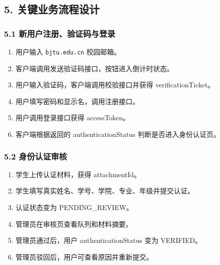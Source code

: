\documentclass[
]{ctexart}
\providecommand{\tightlist}{%
  \setlength{\itemsep}{0pt}\setlength{\parskip}{0pt}}
\begin{document}
\hypertarget{ux5173ux952eux4e1aux52a1ux6d41ux7a0bux8bbeux8ba1}{%
\subsection{5.
关键业务流程设计}\label{ux5173ux952eux4e1aux52a1ux6d41ux7a0bux8bbeux8ba1}}

\hypertarget{ux65b0ux7528ux6237ux6ce8ux518cux9a8cux8bc1ux7801ux4e0eux767bux5f55}{%
\subsubsection{5.1
新用户注册、验证码与登录}\label{ux65b0ux7528ux6237ux6ce8ux518cux9a8cux8bc1ux7801ux4e0eux767bux5f55}}

\begin{enumerate}
\def\labelenumi{\arabic{enumi}.}
\tightlist
\item
  用户输入 \texttt{bjtu.edu.cn} 校园邮箱。
\item
  客户端调用发送验证码接口，按钮进入倒计时状态。
\item
  用户输入验证码，客户端调用校验接口并获得 verificationTicket。
\item
  用户填写密码和显示名，调用注册接口。
\item
  用户调用登录接口获得 accessToken。
\item
  客户端根据返回的 authenticationStatus 判断是否进入身份认证页。
\end{enumerate}

\hypertarget{ux8eabux4efdux8ba4ux8bc1ux5ba1ux6838}{%
\subsubsection{5.2
身份认证审核}\label{ux8eabux4efdux8ba4ux8bc1ux5ba1ux6838}}

\begin{enumerate}
\def\labelenumi{\arabic{enumi}.}
\tightlist
\item
  学生上传认证材料，获得 attachmentId。
\item
  学生填写真实姓名、学号、学院、专业、年级并提交认证。
\item
  认证状态变为 PENDING\_REVIEW。
\item
  管理员在审核页查看队列和材料摘要。
\item
  管理员通过后，用户 authenticationStatus 变为 VERIFIED。
\item
  管理员驳回后，用户可查看原因并重新提交。
\end{enumerate}
\end{document}
